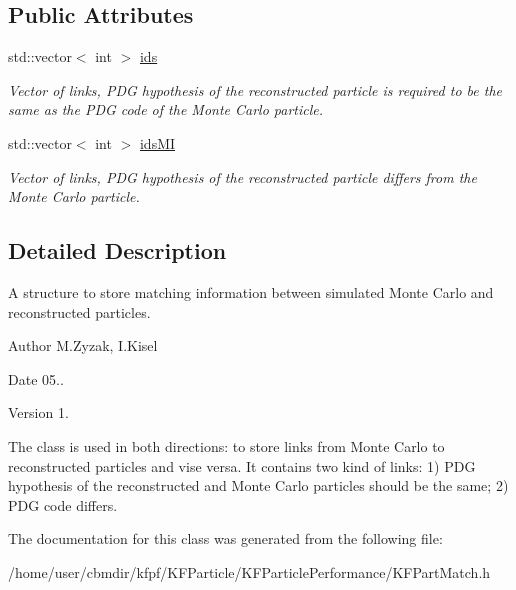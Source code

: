 \subsection*{Public Attributes}
\begin{DoxyCompactItemize}
\item 
std\+::vector$<$ int $>$ \hyperlink{structKFPartMatch_a88eab611c4df50c1d97319e36f753ee4}{ids}\hypertarget{structKFPartMatch_a88eab611c4df50c1d97319e36f753ee4}{}\label{structKFPartMatch_a88eab611c4df50c1d97319e36f753ee4}

\begin{DoxyCompactList}\small\item\em Vector of links, P\+DG hypothesis of the reconstructed particle is required to be the same as the P\+DG code of the Monte Carlo particle. \end{DoxyCompactList}\item 
std\+::vector$<$ int $>$ \hyperlink{structKFPartMatch_a2321951eeffd49c61b8f2590d2fe355d}{ids\+MI}\hypertarget{structKFPartMatch_a2321951eeffd49c61b8f2590d2fe355d}{}\label{structKFPartMatch_a2321951eeffd49c61b8f2590d2fe355d}

\begin{DoxyCompactList}\small\item\em Vector of links, P\+DG hypothesis of the reconstructed particle differs from the Monte Carlo particle. \end{DoxyCompactList}\end{DoxyCompactItemize}


\subsection{Detailed Description}
A structure to store matching information between simulated Monte Carlo and reconstructed particles. 

\begin{DoxyAuthor}{Author}
M.\+Zyzak, I.\+Kisel 
\end{DoxyAuthor}
\begin{DoxyDate}{Date}
05.. 
\end{DoxyDate}
\begin{DoxyVersion}{Version}
1.
\end{DoxyVersion}
The class is used in both directions\+: to store links from Monte Carlo to reconstructed particles and vise versa. It contains two kind of links\+: 1) P\+DG hypothesis of the reconstructed and Monte Carlo particles should be the same; 2) P\+DG code differs. 

The documentation for this class was generated from the following file\+:\begin{DoxyCompactItemize}
\item 
/home/user/cbmdir/kfpf/\+K\+F\+Particle/\+K\+F\+Particle\+Performance/K\+F\+Part\+Match.\+h\end{DoxyCompactItemize}
